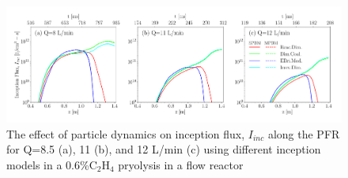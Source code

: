 \begin{figure}[H]
	\centering
	\includegraphics[width=1\textwidth]{Figures/Results/PFR/inception_pdynamiceffect.pdf}
	\caption{The effect of particle dynamics on inception flux, $I_{inc}$ along the PFR for Q=8.5 (a), 11 (b), and 12 L/min (c) using different inception models in a 0.6\%$\mathrm{C_2H_4}$ pryolysis in a flow reactor~\citep{mei2019quantitative}}
	\label{fig:pfr_Iinc_pdynamicseffect} 
\end{figure}



